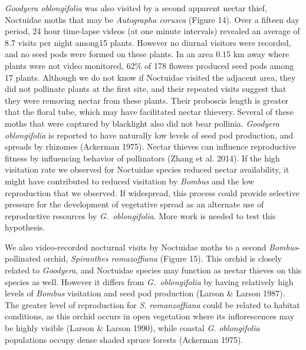 \begin{multicols}{2}
\emph{Goodyera oblongifolia} was also visited by a second apparent
nectar thief, Noctuidae moths that may be \emph{Autographa corusca}
(Figure 14). Over a fifteen day period, 24 hour time-lapse videos (at
one minute intervals) revealed an average of 8.7 visits per night
among15 plants. However no diurnal visitors were recorded, and no seed
pods were formed on these plants. In an area 0.15 km away where plants
were not video monitored, 62\% of 178 flowers produced seed pods among
17 plants. Although we do not know if Noctuidae visited the adjacent
area, they did not pollinate plants at the first site, and their
repeated visits suggest that they were removing nectar from these
plants. Their proboscis length is greater that the floral tube, which
may have facilitated nectar thievery. Several of these moths that were
captured by blacklight also did not bear pollinia. \emph{Goodyera
oblongifolia} is reported to have naturally low levels of seed pod
production, and spreads by rhizomes (Ackerman 1975). Nectar thieves can
influence reproductive fitness by influencing behavior of pollinators
(Zhang et al. 2014). If the high visitation rate we observed for
Noctuidae species reduced nectar availability, it might have contributed
to reduced visitation by \emph{Bombus} and the low reproduction that we
observed. If widespread, this process could provide selective pressure
for the development of vegetative spread as an alternate use of
reproductive resources by \emph{G.\ oblongifolia}. More work is needed to
test this hypothesis.

We also video-recorded nocturnal visits by Noctuidae moths to a second
\emph{Bombus}-pollinated orchid, \emph{Spiranthes romazoffiana} (Figure
15). This orchid is closely related to \emph{Goodyera}, and Noctuidae
species may function as nectar thieves on this species as well. However
it differs from \emph{G.\ oblongifolia} by having relatively high levels
of \emph{Bombus} visitation and seed pod production (Larson \& Larson
1987). The greater level of reproduction for \emph{S.}
\emph{romanzoffiana} could be related to habitat conditions, as this
orchid occurs in open vegetation where its inflorescences may be highly
visible (Larson \& Larson 1990), while coastal \emph{G.}
\emph{oblongifolia} populations occupy dense shaded spruce forests
(Ackerman 1975).


\end{multicols}
